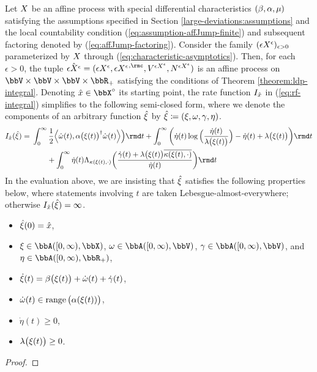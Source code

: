 \begin{theorem}
  \label{eq:ldp-closed-form}
  Let $X$ be an affine process with special differential characteristics $(\beta, \alpha, \mu)$ satisfying the assumptions specified in Section \ref{large-deviations:assumptions} and the local countability condition (\ref{eq:assumption-affJump-finite}) and subsequent factoring denoted by (\ref{eq:affJump-factoring}).
  Consider the family $(\epsilon X^\epsilon)_{\epsilon>0}$ parameterized by $X$ through (\ref{eq:characteristic-asymptotics}).
  Then, for each $\epsilon > 0$, the tuple $\hat\Xe = (\Xe, {\Xe}^{,\rmc}, \V^{\Xe}, \N^{\Xe})$ is an affine process on $\vecSpace \times \vecSpace \times \vecSpace \times \bbR_+$ satisfying the conditions of Theorem \ref{theorem:ldp-integral}.
  Denoting $\hat\stateVar\in \stateSpace^\circ$ its starting point, the rate function $I_{\hat{x}}$ in (\ref{eq:rf-integral}) simplifies to the following semi-closed form, where we denote the components of an arbitrary function $\hat{\xi}$ by $\hat{\xi} \coloneqq (\xi, \omega, \gamma, \eta)$.
  \begin{equation*}
    \rf_{\hat\stateVar}(\hat\pathVar) = 
    \begin{aligned}[t]
      &\int_0^\infty \frac12 \Bprj{\dot\omega(t)}{\affDiff\big(\pathVar(t)\big)^\dagger \dot\omega(t)} \Big) \rmd t 
      + \int_0^\infty \bigg( \dot\eta(t)\log\Big(\frac{\dot\eta(t)}{\affInt\big(\pathVar(t)\big)} \Big) - \dot\eta(t) + \affInt\big(\pathVar(t)\big) \bigg) \rmd t  \\
      &\qquad+ \int_0^\infty \dot\eta(t) \ode_{\affDist(\pathVar(t),\cdot)}\bigg( \frac{\dot\gamma(t) + \affInt\big(\pathVar(t)\big)\overline{\affDist(\pathVar(t), \cdot)}}{\dot\eta(t)} \bigg) \rmd t
    \end{aligned}
  \end{equation*}
  In the evaluation above, we are insisting that $\hat{\xi}$ satisfies the following properties below, where statements involving $t$ are taken Lebesgue-almost-everywhere; otherwise $I_{\hat{x}}(\hat{\xi}) = \infty$.
  \begin{itemize}
    \item
      $\hat{\xi}(0) = \hat{x}$,
    \item
      $\pathVar \in \acpathSpace{[0,\infty)}{\stateSpace}$, $\omega \in \acpathSpace{[0,\infty)}{\vecSpace}$, $\gamma \in \acpathSpace{[0,\infty)}{\vecSpace}$, and $\eta \in \acpathSpace{[0,\infty)}{\bbR_+}$,
    \item
      $\dot{\xi}(t) = \beta\big(\xi(t)\big) + \dot\omega(t) + \dot\gamma(t)$,
    \item
      $\dot\omega(t) \in \operatorname{range}\big(\alpha(\xi(t))\big)$,
    \item
      $\dot\eta(t) \geq 0$,
    \item
      $\lambda\big(\xi(t)\big) \geq 0$.
  \end{itemize}
\end{theorem}
\begin{proof}
\end{proof}
